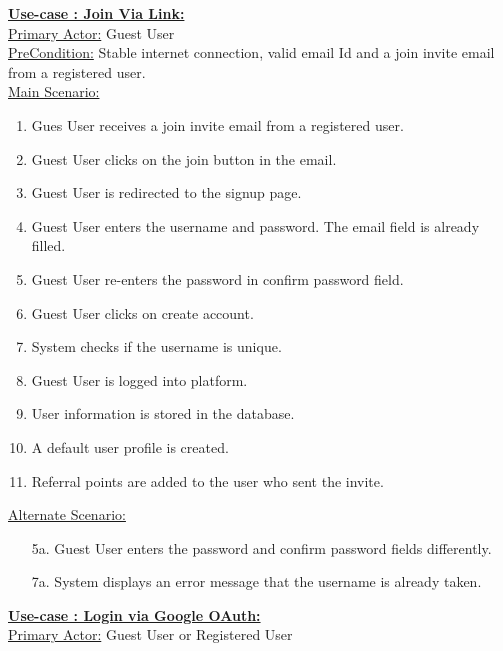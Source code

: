 \documentclass[conference,compsoc]{IEEEtran}
\newcounter{UC}
\newcommand{\nextU}{\stepcounter{UC}\theUC}
\begin{document}
\underline{\textbf{Use-case \nextU: Join Via Link:}}\\

\underline{Primary Actor:} Guest User\\

\underline{PreCondition:} Stable internet connection, valid email Id and a join invite email from a registered user.\\

\underline{Main Scenario:}\\
\begin{enumerate}
    \item Gues User receives a join invite email from a registered user.
    \item Guest User clicks on the join button in the email.
    \item Guest User is redirected to the signup page.
    \item Guest User enters the username and password. The email field is already filled.
    \item Guest User re-enters the password in confirm password field.
    \item Guest User clicks on create account.
    \item System checks if the username is unique.
    \item Guest User is logged into platform.
    \item User information is stored in the database.
    \item A default user profile is created.
    \item Referral points are added to the user who sent the invite.
\end{enumerate}

\underline{Alternate Scenario:}\\
\begin{enumerate}
    \item [5a.] Guest User enters the password and confirm password fields differently.
    \item [7a.] System displays an error message that the username is already taken.
\end{enumerate}\vspace{0.2cm}

\underline{\textbf{Use-case \nextU: Login via Google OAuth:}}\\

\underline{Primary Actor:} Guest User or Registered User\\
\end{document}
